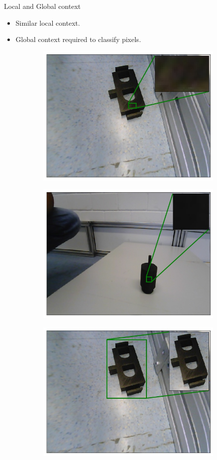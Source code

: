 \documentclass{beamer}
\begin{document}
\begin{frame}{Local and Global context}

	\begin{small}
		\begin{itemize}
			\item Similar local context.
			\item Global context required to classify pixels.
		\end{itemize}
	\end{small}

	\begin{figure}[h]
		\centering
		\begin{subfigure}{.45\textwidth}
			\centering
			\includegraphics[width=.4\linewidth]{images/em_01_context_l}
			\caption{}
			\label{Fig:em01l}
		\end{subfigure}
		\begin{subfigure}{.45\textwidth}
			\centering
			\includegraphics[width=.4\linewidth]{images/motor_context_l}
			\caption{}
			\label{Fig:motorl}
		\end{subfigure}
		\begin{subfigure}{.45\textwidth}
			\centering
			\includegraphics[width=.4\linewidth]{images/em_01_context_g}
			\caption{}
			\label{Fig:em01g}
		\end{subfigure}

\end{figure}
\end{frame}
\end{document}
